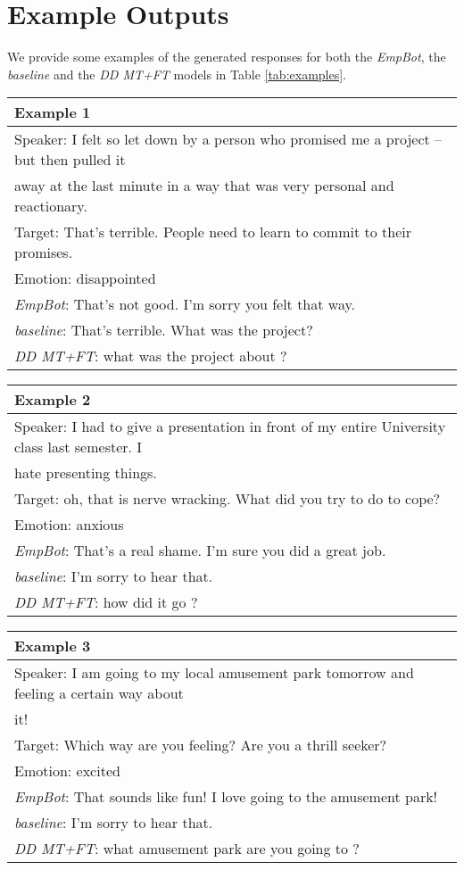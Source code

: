 \documentclass[11pt]{article}
\begin{document}
\section{Example Outputs}\label{sec:example_outputs}
We provide some examples of the generated responses for both the \textit{EmpBot}, the \textit{baseline} and the \textit{DD MT+FT} models in Table \ref{tab:examples}.

\begin{table*}[t!]
\centering
\begin{tabularx}{0.9\textwidth}{l}
\toprule
\textbf{Example 1} \\
\hline
Speaker: I felt so let down by a person who promised me a project -- but then pulled it \\away at the last minute in a way that was very personal and reactionary.\\\hline
Target: That's terrible. People need to learn to commit to their promises.\\
Emotion: disappointed\\ \hline
\textit{EmpBot}: That's not good. I'm sorry you felt that way.\\
\textit{baseline}: That's terrible. What was the project?\\
\textit{DD MT+FT}: what was the project about ?\\
\end{tabularx}

\begin{tabularx}{0.9\textwidth}{l}
\toprule
\textbf{Example 2} \\
\hline
Speaker: I had to give a presentation in front of my entire University class last semester. I \\hate presenting things.\\\hline
Target: oh, that is nerve wracking. What did you try to do to cope?\\
Emotion: anxious\\ \hline
\textit{EmpBot}: That's a real shame. I'm sure you did a great job.\\
\textit{baseline}: I'm sorry to hear that.\\
\textit{DD MT+FT}: how did it go ?\\
\end{tabularx}

\begin{tabularx}{0.9\textwidth}{l}
\toprule
\textbf{Example 3} \\
\hline
Speaker: I am going to my local amusement park tomorrow and feeling a certain way about\\ it! \\\hline
Target: Which way are you feeling? Are you a thrill seeker?\\
Emotion: excited\\ \hline
\textit{EmpBot}: That sounds like fun! I love going to the amusement park!\\
\textit{baseline}: I'm sorry to hear that.\\
\textit{DD MT+FT}: what amusement park are you going to ?\\
\end{tabularx}


\end{table*}
\end{document}
